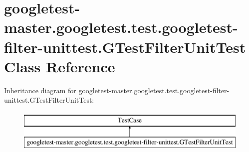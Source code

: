 \hypertarget{classgoogletest-master_1_1googletest_1_1test_1_1googletest-filter-unittest_1_1_g_test_filter_unit_test}{}\section{googletest-\/master.googletest.\+test.\+googletest-\/filter-\/unittest.G\+Test\+Filter\+Unit\+Test Class Reference}
\label{classgoogletest-master_1_1googletest_1_1test_1_1googletest-filter-unittest_1_1_g_test_filter_unit_test}
Inheritance diagram for googletest-\/master.googletest.\+test.\+googletest-\/filter-\/unittest.G\+Test\+Filter\+Unit\+Test\+:\begin{figure}[H]
\begin{center}
\leavevmode
\includegraphics[height=2.000000cm]{d3/d68/classgoogletest-master_1_1googletest_1_1test_1_1googletest-filter-unittest_1_1_g_test_filter_unit_test}
\end{center}
\end{figure}

